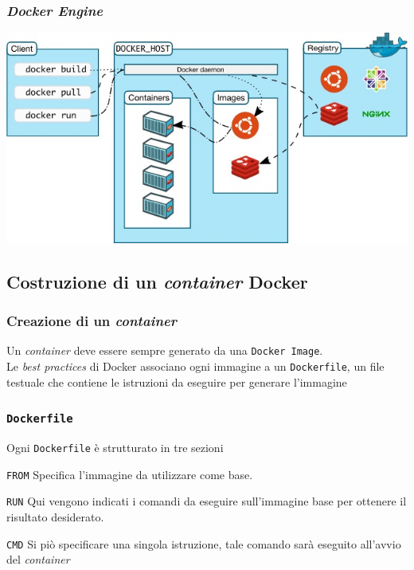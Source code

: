 \documentclass{beamer}
\begin{document}

\begin{frame}
\frametitle{ \textit{Docker Engine}}
\includegraphics[width=\textwidth]{pic2}
\end{frame}


\subsection{Costruzione di un \textit{container} Docker}

\begin{frame}
\frametitle{Creazione di un \textit{container}}
Un  \textit{container} deve essere sempre generato da una \texttt{Docker Image}.\\
Le  \textit{best practices} di Docker associano ogni immagine a un \texttt{Dockerfile}, un file testuale che contiene le istruzioni da eseguire per generare l'immagine
\end{frame}

\begin{frame}
\frametitle{\texttt{Dockerfile}}
Ogni \texttt{Dockerfile} è strutturato in tre sezioni
\begin{block}{ \texttt{FROM}}
Specifica l'immagine da utilizzare come base.
\end{block}

\begin{block}{\texttt{RUN}}
Qui vengono indicati i comandi da eseguire sull'immagine base per ottenere il risultato desiderato.
\end{block}

\begin{block}{\texttt{CMD}}
Si piò specificare una singola istruzione, tale comando sarà eseguito all'avvio del \textit{container}
\end{block}
\end{frame}
\end{document}

